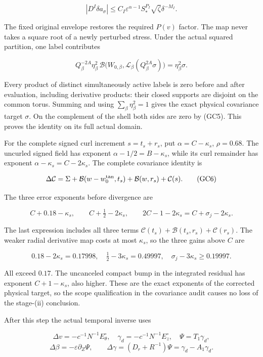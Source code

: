 \documentclass[10pt,a4paper]{article}
\begin{document}
\[
|D^I\delta a_\sigma|\le
C_I\varepsilon^{\alpha-1}S_*^{P_I}\sqrt\zeta\delta^{-M_I}.
\]

The fixed original envelope restores the required \(P(v)\) factor. The map never takes a square root of a newly perturbed stress. Under the actual squared partition, one label contributes

\[
Q_\beta^{-2A}\eta_\beta^2\,
\mathcal B\big(W_{0,\beta},\mathcal L_\beta(Q_\beta^{2A}\sigma)\big)
=\eta_\beta^2\sigma.
\]

Every product of distinct simultaneously active labels is zero before and after evaluation, including derivative products: their closed supports are disjoint on the common torus. Summing and using \(\sum_\beta\eta_\beta^2=1\) gives the exact physical covariance target \(\sigma\). On the complement of the shell both sides are zero by (GC5). This proves the identity on its full actual domain.

For the complete signed curl increment \(s=t_s+r_s\), put \(\alpha=C-\kappa_s\), \(\rho=0.68\). The uncurled signed field has exponent \(\alpha-1/2=B-\kappa_s\), while its curl remainder has exponent \(\alpha-\kappa_s=C-2\kappa_s\). The complete covariance identity is

\[
\Delta\mathcal C
=\Sigma+\mathcal B(w-w_0^{\rm tan},t_s)
+\mathcal B(w,r_s)+\mathcal C(s).
\tag{GC6}
\]

The three error exponents before divergence are

\[
C+0.18-\kappa_s,\qquad
C+\tfrac12-2\kappa_s,\qquad
2C-1-2\kappa_s=C+\sigma_j-2\kappa_s.
\]

The last expression includes all three terms \(\mathcal C(t_s)+\mathcal B(t_s,r_s)+\mathcal C(r_s)\). The weaker radial derivative map costs at most \(\kappa_s\), so the three gains above \(C\) are

\[
0.18-2\kappa_s=0.17998,\quad
\tfrac12-3\kappa_s=0.49997,\quad
\sigma_j-3\kappa_s\ge0.19997.
\]

All exceed \(0.17\). The uncanceled compact bump in the integrated residual has exponent \(C+1-\kappa_s\), also higher. These are the exact exponents of the corrected physical target, so the scope qualification in the covariance audit causes no loss of the stage-(ii) conclusion.

After this step the actual temporal inverse uses

\[
\Delta v=-c^{-1}N^{-1}E_\theta^\circ,\quad
\gamma_d=-c^{-1}N^{-1}E_z^\circ,\quad
\Psi=T_1\gamma_d,
\] \[
\Delta\beta=-\varepsilon\partial_Z\Psi,\qquad
\Delta\gamma=(D_r+R^{-1})\Psi
=\gamma_d-A_1\gamma_d.
\]
\end{document}

